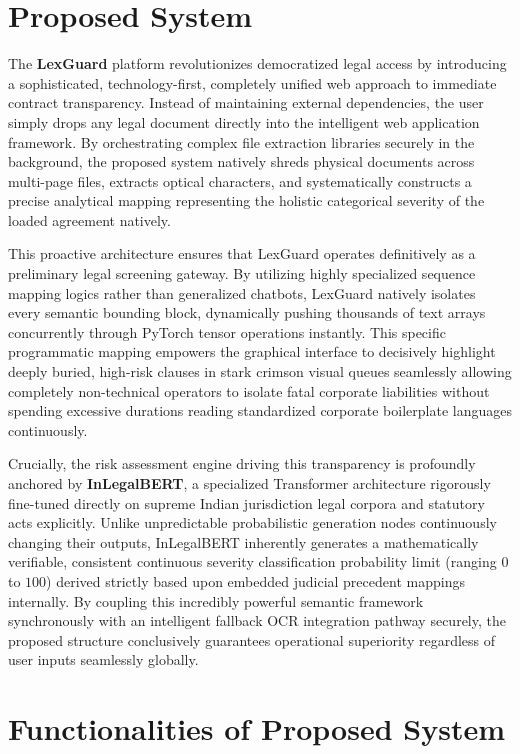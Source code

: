\documentclass[a4paper,12pt]{report}
\begin{document}
\section{Proposed System}

The \textbf{LexGuard} platform revolutionizes democratized legal access by introducing a sophisticated, technology-first, completely unified web approach to immediate contract transparency. Instead of maintaining external dependencies, the user simply drops any legal document directly into the intelligent web application framework. By orchestrating complex file extraction libraries securely in the background, the proposed system natively shreds physical documents across multi-page files, extracts optical characters, and systematically constructs a precise analytical mapping representing the holistic categorical severity of the loaded agreement natively.

This proactive architecture ensures that LexGuard operates definitively as a preliminary legal screening gateway. By utilizing highly specialized sequence mapping logics rather than generalized chatbots, LexGuard natively isolates every semantic bounding block, dynamically pushing thousands of text arrays concurrently through PyTorch tensor operations instantly. This specific programmatic mapping empowers the graphical interface to decisively highlight deeply buried, high-risk clauses in stark crimson visual queues seamlessly allowing completely non-technical operators to isolate fatal corporate liabilities without spending excessive durations reading standardized corporate boilerplate languages continuously.

Crucially, the risk assessment engine driving this transparency is profoundly anchored by \textbf{InLegalBERT}, a specialized Transformer architecture rigorously fine-tuned directly on supreme Indian jurisdiction legal corpora and statutory acts explicitly. Unlike unpredictable probabilistic generation nodes continuously changing their outputs, InLegalBERT inherently generates a mathematically verifiable, consistent continuous severity classification probability limit (ranging $0$ to $100$) derived strictly based upon embedded judicial precedent mappings internally. By coupling this incredibly powerful semantic framework synchronously with an intelligent fallback OCR integration pathway securely, the proposed structure conclusively guarantees operational superiority regardless of user inputs seamlessly globally.

\section{Functionalities of Proposed System}
\end{document}
